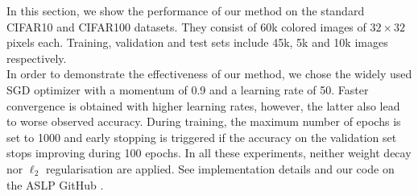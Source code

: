   In this section, we show the performance of our method on the standard CIFAR10
  and CIFAR100 datasets.   They consist of  60k  colored images of $32\times 32$
  pixels each.  Training,  validation and test sets  include  45k,  5k and 10k
  images respectively.  \\  In order to demonstrate the effectiveness of our
  method, we chose the widely used SGD optimizer with a momentum of  0.9  and a
  learning rate of 50.    Faster convergence is obtained with higher learning
  rates,   however,  the latter also lead  to worse observed accuracy.   During
  training,  the maximum number of epochs is set to 1000 and early stopping is
  triggered  if the accuracy on the validation set stops improving during 100
  epochs.   In all these experiments, neither weight decay nor $\ell_2$
  regularisation are applied. See implementation details and our code on the ASLP GitHub
  \cite{Dupont2022}.

